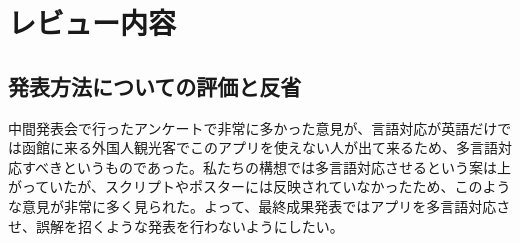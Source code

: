 \documentclass[openany,11pt,papersize]{jsbook}
\begin{document}
\section{レビュー内容}

\subsection{発表方法についての評価と反省}
 中間発表会で行ったアンケートで非常に多かった意見が、言語対応が英語だけでは函館に来る外国人観光客でこのアプリを使えない人が出て来るため、多言語対応すべきというものであった。私たちの構想では多言語対応させるという案は上がっていたが、スクリプトやポスターには反映されていなかったため、このような意見が非常に多く見られた。よって、最終成果発表ではアプリを多言語対応させ、誤解を招くような発表を行わないようにしたい。
\end{document}
